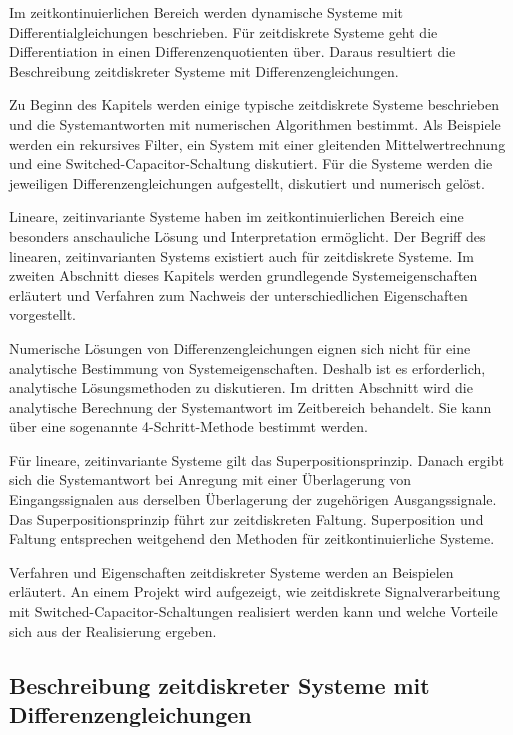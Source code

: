 \noindent Im zeitkontinuierlichen Bereich werden dynamische Systeme mit Differentialgleichungen beschrieben. F\"{u}r zeitdiskrete Systeme geht die Differentiation in einen Differenzenquotienten \"{u}ber. Daraus resultiert die Beschreibung zeitdiskreter Systeme mit Differenzengleichungen. \medskip

\noindent Zu Beginn des Kapitels werden einige typische zeitdiskrete Systeme beschrieben und die Systemantworten mit numerischen Algorithmen bestimmt. Als Beispiele werden ein rekursives Filter, ein System mit einer gleitenden Mittelwertrechnung und eine Switched-Capacitor-Schaltung diskutiert. F\"{u}r die Systeme werden die jeweiligen Differenzengleichungen aufgestellt, diskutiert und numerisch gel\"{o}st.\medskip

\noindent Lineare, zeitinvariante Systeme haben im zeitkontinuierlichen Bereich eine besonders anschauliche L\"{o}sung und Interpretation erm\"{o}glicht. Der Begriff des linearen, zeitinvarianten Systems existiert auch f\"{u}r zeitdiskrete Systeme. Im zweiten Abschnitt dieses Kapitels werden grundlegende Systemeigenschaften erl\"{a}utert und Verfahren zum Nachweis der unterschiedlichen Eigenschaften vorgestellt.\medskip

\noindent Numerische L\"{o}sungen von Differenzengleichungen eignen sich nicht f\"{u}r eine analytische Bestimmung von Systemeigenschaften. Deshalb ist es erforderlich, analytische L\"{o}sungsmethoden zu diskutieren. Im dritten Abschnitt wird die analytische Berechnung der Systemantwort im Zeitbereich behandelt. Sie kann \"{u}ber eine sogenannte 4-Schritt-Methode bestimmt werden. \medskip

\noindent F\"{u}r lineare, zeitinvariante Systeme gilt das Superpositionsprinzip. Danach ergibt sich die Systemantwort bei Anregung mit einer \"{U}berlagerung von Eingangssignalen aus derselben \"{U}berlagerung der zugeh\"{o}rigen Ausgangssignale. Das Superpositionsprinzip f\"{u}hrt zur zeitdiskreten Faltung. Superposition und Faltung entsprechen weitgehend den Methoden f\"{u}r zeitkontinuierliche Systeme. \medskip

\noindent Verfahren und Eigenschaften zeitdiskreter Systeme werden an Beispielen erl\"{a}utert. An einem Projekt wird aufgezeigt, wie zeitdiskrete Signalverarbeitung mit Switched-Capacitor-Schaltungen realisiert werden kann und welche Vorteile sich aus der Realisierung ergeben.


\subsection{ Beschreibung zeitdiskreter Systeme mit Differenzengleichungen}\label{sfourone}

